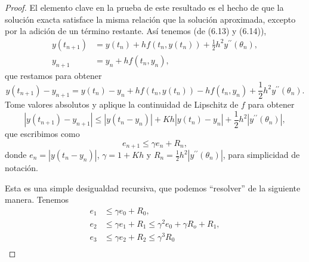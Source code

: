 \begin{proof}
El elemento clave en la prueba de este resultado es el hecho de que la solución exacta satisface la misma relación que la solución aproximada, excepto por la adición de un término restante. Así tenemos (de (6.13) y (6.14)),
\begin{align*}
y\left(t_{n+1}\right)&=y\left(t_{n}\right)+hf\left(t_{n},y\left(t_{n}\right)\right)+\frac{1}{2}h^{2}y^{\prime\prime}\left(\theta_{n}\right),\\
y_{n+1}&=y_{n}+hf\left(t_{n},y_{n}\right),
\end{align*}
que restamos para obtener
\[ y\left(t_{n+1}\right)-y_{n+1}=y\left(t_{n}\right)-y_{n}+hf\left(t_{n},y\left(t_{n}\right)\right)-hf\left(t_{n},y_{n}\right)+\frac{1}{2}h^{2}y^{\prime\prime}\left(\theta_{n}\right). \]
Tome valores absolutos y aplique la continuidad de Lipschitz de $ f$ para obtener
\[ \left|y\left(t_{n+1}\right)-y_{n+1}\right|\leq\left|y\left(t_{n}-y_{n}\right)\right|+Kh\left|y\left(t_{n}\right)-y_{n}\right|+\frac{1}{2}h^{2}\left|y^{\prime\prime}\left(\theta_{n}\right)\right|, \]
que escribimos como
\[ e_{n+1}\leq\gamma e_{n}+R_{n}, \]
donde $e_{n}=\left|y\left(t_{n}-y_{n}\right)\right|$, $\gamma=1+Kh$ y $R_{n}=\frac{1}{2}h^{2}\left|y^{\prime\prime}\left(\theta_{n}\right)\right|$, para simplicidad de notación.

Esta es una simple desigualdad recursiva, que podemos ``resolver'' de la siguiente manera. Tenemos
\begin{align*}
e_{1}&\leq\gamma e_{0}+R_{0},\\
e_{2}&\leq\gamma e_{1}+R_{1}\leq\gamma^{2}e_{0}+\gamma R_{o}+R_{1},\\
e_{3}&\leq\gamma e_{2}+R_{2}\leq\gamma^{3}R_{0}\\
\end{align*}
\end{proof}